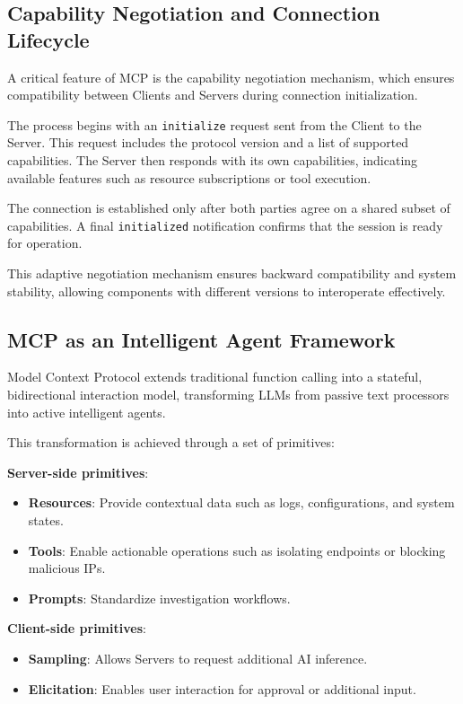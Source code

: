 \documentclass[12pt]{report}
\begin{document}
\subsection{Capability Negotiation and Connection Lifecycle}

A critical feature of MCP is the capability negotiation mechanism, which ensures compatibility between Clients and Servers during connection initialization.

The process begins with an \texttt{initialize} request sent from the Client to the Server. This request includes the protocol version and a list of supported capabilities. The Server then responds with its own capabilities, indicating available features such as resource subscriptions or tool execution.

The connection is established only after both parties agree on a shared subset of capabilities. A final \texttt{initialized} notification confirms that the session is ready for operation.

This adaptive negotiation mechanism ensures backward compatibility and system stability, allowing components with different versions to interoperate effectively.


\subsection{MCP as an Intelligent Agent Framework}

Model Context Protocol extends traditional function calling into a stateful, bidirectional interaction model, transforming LLMs from passive text processors into active intelligent agents.

This transformation is achieved through a set of primitives:

\textbf{Server-side primitives}:
\begin{itemize}
    \item \textbf{Resources}: Provide contextual data such as logs, configurations, and system states.
    \item \textbf{Tools}: Enable actionable operations such as isolating endpoints or blocking malicious IPs.
    \item \textbf{Prompts}: Standardize investigation workflows.
\end{itemize}

\textbf{Client-side primitives}:
\begin{itemize}
    \item \textbf{Sampling}: Allows Servers to request additional AI inference.
    \item \textbf{Elicitation}: Enables user interaction for approval or additional input.
\end{itemize}
\end{document}
